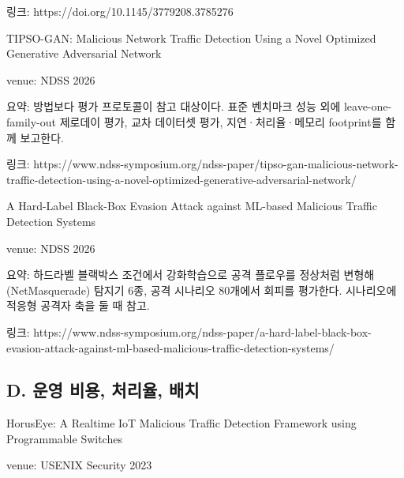 \par\noindent \textbullet\enspace 링크: https:/\allowbreak{}/\allowbreak{}doi.org/\allowbreak{}10.1145/\allowbreak{}3779208.3785276


\par\noindent \textbullet\enspace TIPSO-GAN: Malicious Network Traffic Detection Using a Novel Optimized Generative Adversarial Network


\par\noindent \textbullet\enspace venue: NDSS 2026


\par\noindent \textbullet\enspace 요약: 방법보다 평가 프로토콜이 참고 대상이다. 표준 벤치마크 성능 외에 leave-one-family-out 제로데이 평가, 교차 데이터셋 평가, 지연·처리율·메모리 footprint를 함께 보고한다.


\par\noindent \textbullet\enspace 링크: https:/\allowbreak{}/\allowbreak{}www.ndss-symposium.org/\allowbreak{}ndss-paper/\allowbreak{}tipso-gan-malicious-network-traffic-detection-using-a-novel-optimized-generative-adversarial-network/\allowbreak{}


\par\noindent \textbullet\enspace A Hard-Label Black-Box Evasion Attack against ML-based Malicious Traffic Detection Systems


\par\noindent \textbullet\enspace venue: NDSS 2026


\par\noindent \textbullet\enspace 요약: 하드라벨 블랙박스 조건에서 강화학습으로 공격 플로우를 정상처럼 변형해(NetMasquerade) 탐지기 6종, 공격 시나리오 80개에서 회피를 평가한다. 시나리오에 적응형 공격자 축을 둘 때 참고.


\par\noindent \textbullet\enspace 링크: https:/\allowbreak{}/\allowbreak{}www.ndss-symposium.org/\allowbreak{}ndss-paper/\allowbreak{}a-hard-label-black-box-evasion-attack-against-ml-based-malicious-traffic-detection-systems/\allowbreak{}


\subsection{D. 운영 비용, 처리율, 배치}
\par\noindent \textbullet\enspace HorusEye: A Realtime IoT Malicious Traffic Detection Framework using Programmable Switches


\par\noindent \textbullet\enspace venue: USENIX Security 2023



